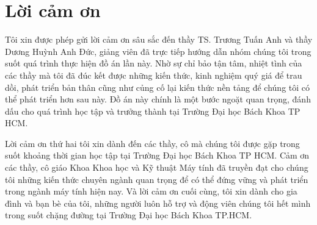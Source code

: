 \section*{Lời cảm ơn}

\hspace*{0.63cm}Tôi xin được phép gửi lời cảm ơn sâu sắc đến thầy TS. Trương Tuấn Anh và thầy Dương Huỳnh Anh Đức, giảng viên đã trực tiếp hướng dẫn nhóm chúng tôi trong suốt quá trình thực hiện đồ án lần này. Nhờ sự chỉ bảo tận tâm, nhiệt tình của các thầy mà tôi đã đúc kết được những kiến thức, kinh nghiệm quý giá để trau dồi, phát triển bản thân cũng như củng cố lại kiến thức nền tảng để chúng tôi có thể phát triển hơn sau này. Đồ án này chính là một bước ngoặt quan trọng, đánh dấu cho quá trình học tập và trưởng thành tại Trường Đại học Bách Khoa TP HCM.

\hspace*{0.63cm}Lời cảm ơn thứ hai tôi xin dành đến các thầy, cô mà chúng tôi được gặp trong suốt khoảng thời gian học tập tại Trường Đại học Bách Khoa TP HCM. Cảm ơn các thầy, cô giáo Khoa Khoa học và Kỹ thuật Máy tính đã truyền đạt cho chúng tôi những kiến thức chuyên ngành quan trọng để có thể đứng vững và phát triển trong ngành máy tính hiện nay. Và lời cảm ơn cuối cùng, tôi xin dành cho gia đình và bạn bè của tôi, những người luôn hỗ trợ và động viên chúng tôi hết mình trong suốt chặng đường tại Trường Đại học Bách Khoa TP.HCM.

\clearpage
